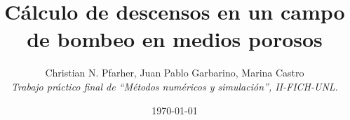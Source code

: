 \documentclass[10pt,a4paper,final]{article}
\begin{document}
\title{Cálculo de descensos en un campo de bombeo en medios porosos}
\author{Christian N. Pfarher, Juan Pablo Garbarino, Marina Castro\\
\textit{Trabajo práctico final de ``Métodos numéricos y simulación'', II-FICH-UNL.}}
\date{\today}
\maketitle
\newpage
\tableofcontents
\newpage
\listoffigures %
\newpage
\end{document}
